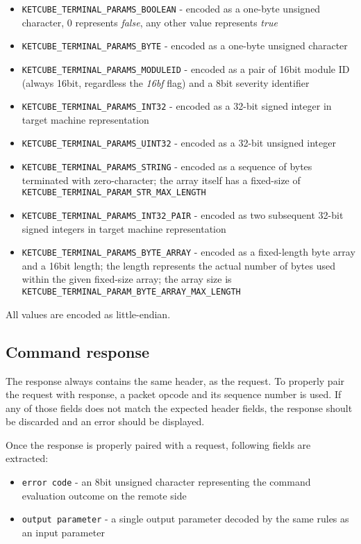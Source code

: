 \begin{itemize}
	\item \texttt{KETCUBE\_TERMINAL\_PARAMS\_BOOLEAN} - encoded as a one-byte unsigned character, 0 represents \textit{false}, any other value represents \textit{true}
	\item \texttt{KETCUBE\_TERMINAL\_PARAMS\_BYTE} - encoded as a one-byte unsigned character
	\item \texttt{KETCUBE\_TERMINAL\_PARAMS\_MODULEID} - encoded as a pair of 16bit module ID (always 16bit, regardless the \textit{16bf} flag) and a 8bit severity identifier
	\item \texttt{KETCUBE\_TERMINAL\_PARAMS\_INT32} - encoded as a 32-bit signed integer in target machine representation
	\item \texttt{KETCUBE\_TERMINAL\_PARAMS\_UINT32} - encoded as a 32-bit unsigned integer
	\item \texttt{KETCUBE\_TERMINAL\_PARAMS\_STRING} - encoded as a sequence of bytes terminated with zero-character; the array itself has a fixed-size of \texttt{KETCUBE\_TERMINAL\_PARAM\_STR\_MAX\_LENGTH}
	\item \texttt{KETCUBE\_TERMINAL\_PARAMS\_INT32\_PAIR} - encoded as two subsequent 32-bit signed integers in target machine representation
	\item \texttt{KETCUBE\_TERMINAL\_PARAMS\_BYTE\_ARRAY} - encoded as a fixed-length byte array and a 16bit length; the length represents the actual number of bytes used within the given fixed-size array; the array size is \texttt{KETCUBE\_TERMINAL\_PARAM\_BYTE\_ARRAY\_MAX\_LENGTH}
\end{itemize}

All values are encoded as little-endian.

\subsection{Command response}

The response always contains the same header, as the request. To properly pair the request with response, a packet opcode and its sequence number is used. If any of those fields does not match the expected header fields, the response shoult be discarded and an error should be displayed.

Once the response is properly paired with a request, following fields are extracted:

\begin{itemize}
	\item \texttt{error code} - an 8bit unsigned character representing the command evaluation outcome on the remote side
	\item \texttt{output parameter} - a single output parameter decoded by the same rules as an input parameter
\end{itemize}

